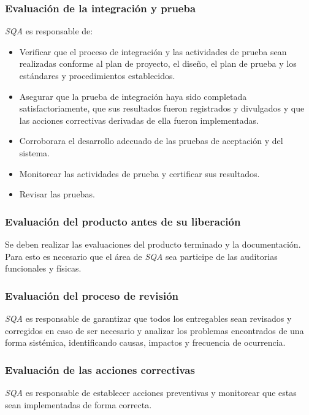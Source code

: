 \subsubsection{Evaluación de la integración y prueba}

\emph{SQA} es responsable de:

	\begin{itemize}
		\item 
		Verificar que el proceso de integración y las actividades de prueba sean realizadas conforme al plan de proyecto, el diseño, el plan de prueba y los estándares y procedimientos establecidos.
		\item
		Asegurar que la prueba de integración haya sido completada satisfactoriamente, que sus resultados fueron registrados y divulgados y que las acciones correctivas derivadas de ella fueron implementadas.
		\item	
		Corroborara el desarrollo adecuado de las pruebas de aceptación y del sistema.
		\item
		Monitorear las actividades de prueba y certificar sus resultados.
		\item
		Revisar las pruebas.
	\end{itemize}

\subsubsection{Evaluación del producto antes de su liberación}

Se deben realizar las evaluaciones del producto terminado y la documentación. Para esto es necesario que el área de \emph{SQA} sea participe de las auditorias funcionales y físicas. 

\subsubsection{Evaluación del proceso de revisión}

\emph{SQA} es responsable de garantizar que todos los entregables sean revisados y corregidos en caso de ser necesario y analizar los problemas encontrados de una forma sistémica, identificando causas, impactos y frecuencia de ocurrencia.

\subsubsection{Evaluación de las acciones correctivas}

\emph{SQA} es responsable de establecer acciones preventivas y monitorear que estas sean implementadas de forma correcta. 

